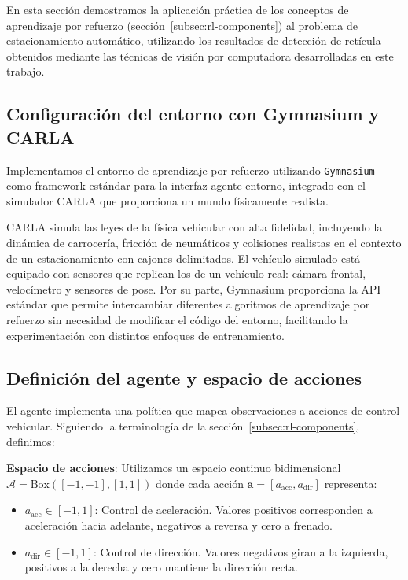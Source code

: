 
En esta sección demostramos la aplicación práctica de los conceptos de aprendizaje por refuerzo
(sección~\ref{subsec:rl-components}) al problema de estacionamiento automático, utilizando
los resultados de detección de retícula obtenidos mediante las técnicas de visión por computadora
desarrolladas en este trabajo.

\subsection{Configuración del entorno con Gymnasium y CARLA}\label{subsec:rl-environment}

Implementamos el entorno de aprendizaje por refuerzo utilizando \texttt{Gymnasium} como framework
estándar para la interfaz agente-entorno, integrado con el simulador CARLA que proporciona
un mundo físicamente realista. 

CARLA simula las leyes de la física vehicular con alta fidelidad, incluyendo la dinámica de carrocería, 
fricción de neumáticos y colisiones realistas en el contexto de un estacionamiento con cajones delimitados. 
El vehículo simulado está equipado con sensores que replican los de un vehículo real: cámara frontal, 
velocímetro y sensores de pose. Por su parte, Gymnasium proporciona la API estándar que permite 
intercambiar diferentes algoritmos de aprendizaje por refuerzo sin necesidad de modificar el código 
del entorno, facilitando la experimentación con distintos enfoques de entrenamiento.

\subsection{Definición del agente y espacio de acciones}\label{subsec:rl-agent}

El agente implementa una política que mapea observaciones a acciones de control vehicular.
Siguiendo la terminología de la sección~\ref{subsec:rl-components}, definimos:


\textbf{Espacio de acciones}: Utilizamos un espacio continuo bidimensional
$\mathcal{A} = \text{Box}([-1, -1], [1, 1])$ donde cada acción $\mathbf{a} = [a_{\text{acc}}, a_{\text{dir}}]$ representa:
\begin{itemize}
    \item $a_{\text{acc}} \in [-1, 1]$: Control de aceleración. Valores positivos corresponden
    a aceleración hacia adelante, negativos a reversa y cero a frenado.
    \item $a_{\text{dir}} \in [-1, 1]$: Control de dirección. Valores negativos giran a la izquierda,
    positivos a la derecha y cero mantiene la dirección recta.
\end{itemize}

